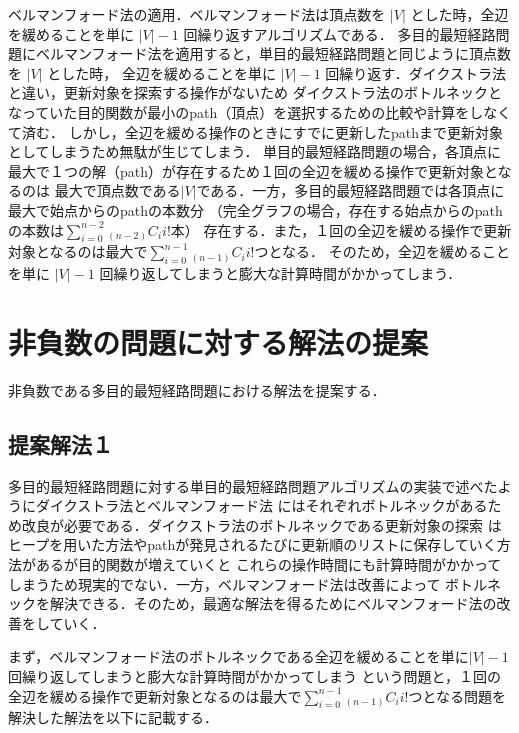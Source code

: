 \documentclass[12pt]{optlab-bachelor}
\begin{document}
ベルマンフォード法の適用．ベルマンフォード法は頂点数を $|V|$ とした時，全辺を緩めることを単に $|V|-1$ 回繰り返すアルゴリズムである．
多目的最短経路問題にベルマンフォード法を適用すると，単目的最短経路問題と同じように頂点数を $|V|$ とした時，
全辺を緩めることを単に $|V|-1$ 回繰り返す．ダイクストラ法と違い，更新対象を探索する操作がないため
ダイクストラ法のボトルネックとなっていた目的関数が最小のpath（頂点）を選択するための比較や計算をしなくて済む．
しかし，全辺を緩める操作のときにすでに更新したpathまで更新対象としてしまうため無駄が生じてしまう．
単目的最短経路問題の場合，各頂点に最大で１つの解（path）が存在するため１回の全辺を緩める操作で更新対象となるのは
最大で頂点数である$|V|$である．一方，多目的最短経路問題では各頂点に最大で始点からのpathの本数分
（完全グラフの場合，存在する始点からのpathの本数は$\displaystyle \sum_{i=0}^{n-2} {}_{(n-2)}C_i i!$本）
存在する．また，１回の全辺を緩める操作で更新対象となるのは最大で$\displaystyle \sum_{i=0}^{n-1} {}_{(n-1)}C_i i!$つとなる．
そのため，全辺を緩めることを単に $|V|-1$ 回繰り返してしまうと膨大な計算時間がかかってしまう．

\section{非負数の問題に対する解法の提案}
非負数である多目的最短経路問題における解法を提案する．

\subsection{提案解法１}
多目的最短経路問題に対する単目的最短経路問題アルゴリズムの実装で述べたようにダイクストラ法とベルマンフォード法
にはそれぞれボトルネックがあるため改良が必要である．ダイクストラ法のボトルネックである更新対象の探索
はヒープを用いた方法やpathが発見されるたびに更新順のリストに保存していく方法があるが目的関数が増えていくと
これらの操作時間にも計算時間がかかってしまうため現実的でない．一方，ベルマンフォード法は改善によって
ボトルネックを解決できる．そのため，最適な解法を得るためにベルマンフォード法の改善をしていく．

まず，ベルマンフォード法のボトルネックである全辺を緩めることを単に$|V|-1$ 回繰り返してしまうと膨大な計算時間がかかってしまう
という問題と，１回の全辺を緩める操作で更新対象となるのは最大で$\displaystyle \sum_{i=0}^{n-1} {}_{(n-1)}C_i i!$つとなる問題を
解決した解法を以下に記載する．
\end{document}

